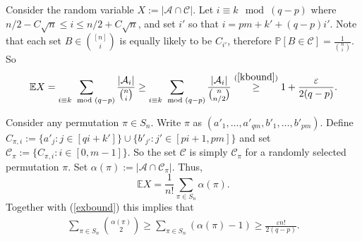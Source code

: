 \documentclass[11pt]{article}
\numberwithin{equation}{section}
\def\eps{\varepsilon}
\begin{document}
Consider the random variable $X:=|\mathcal{A}\cap \mathcal{C}|$. 
Let  $i \equiv k \mod (q-p)$ where $n/2 -C \sqrt{n} \leq i\leq n/2 +C \sqrt{n}$, and set $i'$ so that $i=pm+k'+(q-p)i'$.
Note that each set $B\in \binom{[n]}{i}$ is equally likely to be  $C_{i'}$, therefore $\mathbb P[B\in\mathcal{C}]=\frac{1}{\binom{n}{i}}$. So 
\begin{align}\label{exbound}
\mathbb EX=\sum_{i \equiv k \mod (q-p)} \frac{|\mathcal{A}_i|}{\binom{n}{i}}\geq \sum_{i \equiv k \mod (q-p)} \frac{|\mathcal{A}_i|}{\binom{n}{n/2}} \stackrel{(\ref{kbound})}{\geq} 1+\frac{\eps}{2(q-p)}.
\end{align}

Consider any permutation $\pi \in S_n$. Write $\pi$ as $(a'_1,  \ldots, a'_{qm},b'_1,\ldots,b'_{pm})$. Define $C_{\pi,i}:=\{a'_j : j\in [qi+k']\}\cup\{b'_{j'} : j'\in [pi+1,pm]\}$ and set $\mathcal{C_ \pi}:=\{C_{\pi,i} : i\in [0,m-1]\}.$ So the set $\mathcal C$ is simply $\mathcal C_\pi$ for a randomly selected permutation $\pi$. Set $\alpha (\pi):=|\mathcal A \cap \mathcal C_\pi|$.
Thus, 
$$\mathbb EX =\frac{1}{n!} \sum _{\pi \in S_n} \alpha (\pi).$$
Together with (\ref{exbound}) this implies that
\begin{align}\label{final}
\sum _{\pi \in S_n} \binom{\alpha (\pi)}{2} \geq \sum _{\pi \in S_n} (\alpha (\pi)-1) \geq \frac{\eps n!}{2(q-p)}.
\end{align}
\end{document}
